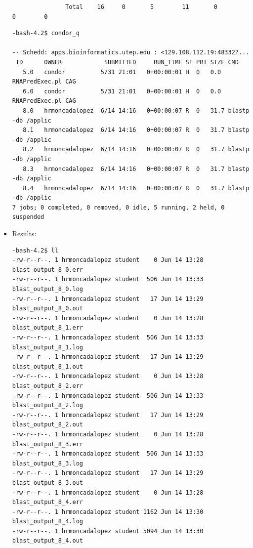 \documentclass{article}
\begin{document}
\begin{itemize}
\begin{verbatim}
               Total    16     0       5        11       0          0        0      
\end{verbatim}
\normalsize

\scriptsize
\begin{verbatim}
-bash-4.2$ condor_q

-- Schedd: apps.bioinformatics.utep.edu : <129.108.112.19:48332?...
 ID      OWNER            SUBMITTED     RUN_TIME ST PRI SIZE CMD               
   5.0   condor          5/31 21:01   0+00:00:01 H  0   0.0  RNAPredExec.pl CAG
   6.0   condor          5/31 21:01   0+00:00:01 H  0   0.0  RNAPredExec.pl CAG
   8.0   hrmoncadalopez  6/14 14:16   0+00:00:07 R  0   31.7 blastp -db /applic
   8.1   hrmoncadalopez  6/14 14:16   0+00:00:07 R  0   31.7 blastp -db /applic
   8.2   hrmoncadalopez  6/14 14:16   0+00:00:07 R  0   31.7 blastp -db /applic
   8.3   hrmoncadalopez  6/14 14:16   0+00:00:07 R  0   31.7 blastp -db /applic
   8.4   hrmoncadalopez  6/14 14:16   0+00:00:07 R  0   31.7 blastp -db /applic
7 jobs; 0 completed, 0 removed, 0 idle, 5 running, 2 held, 0 suspended
\end{verbatim}
\normalsize
\item Results:
\scriptsize
\begin{verbatim}
-bash-4.2$ ll
-rw-r--r--. 1 hrmoncadalopez student    0 Jun 14 13:28 blast_output_8_0.err
-rw-r--r--. 1 hrmoncadalopez student  506 Jun 14 13:33 blast_output_8_0.log
-rw-r--r--. 1 hrmoncadalopez student   17 Jun 14 13:29 blast_output_8_0.out
-rw-r--r--. 1 hrmoncadalopez student    0 Jun 14 13:28 blast_output_8_1.err
-rw-r--r--. 1 hrmoncadalopez student  506 Jun 14 13:33 blast_output_8_1.log
-rw-r--r--. 1 hrmoncadalopez student   17 Jun 14 13:29 blast_output_8_1.out
-rw-r--r--. 1 hrmoncadalopez student    0 Jun 14 13:28 blast_output_8_2.err
-rw-r--r--. 1 hrmoncadalopez student  506 Jun 14 13:33 blast_output_8_2.log
-rw-r--r--. 1 hrmoncadalopez student   17 Jun 14 13:29 blast_output_8_2.out
-rw-r--r--. 1 hrmoncadalopez student    0 Jun 14 13:28 blast_output_8_3.err
-rw-r--r--. 1 hrmoncadalopez student  506 Jun 14 13:33 blast_output_8_3.log
-rw-r--r--. 1 hrmoncadalopez student   17 Jun 14 13:29 blast_output_8_3.out
-rw-r--r--. 1 hrmoncadalopez student    0 Jun 14 13:28 blast_output_8_4.err
-rw-r--r--. 1 hrmoncadalopez student 1162 Jun 14 13:30 blast_output_8_4.log
-rw-r--r--. 1 hrmoncadalopez student 5094 Jun 14 13:30 blast_output_8_4.out

\end{verbatim}
\normalsize
\end{itemize}
\end{document}
